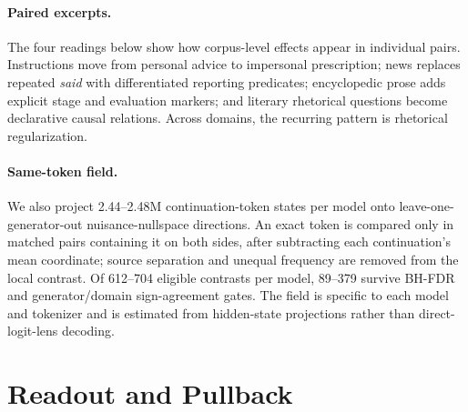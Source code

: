 \paragraph{Paired excerpts.} The four readings below show how corpus-level effects appear in individual pairs. Instructions move from personal advice to impersonal prescription; news replaces repeated \emph{said} with differentiated reporting predicates; encyclopedic prose adds explicit stage and evaluation markers; and literary rhetorical questions become declarative causal relations. Across domains, the recurring pattern is rhetorical regularization.

\paragraph{Same-token field.}\label{app:token-field} We also project 2.44--2.48M continuation-token states per model onto leave-one-generator-out nuisance-nullspace directions. An exact token is compared only in matched pairs containing it on both sides, after subtracting each continuation's mean coordinate; source separation and unequal frequency are removed from the local contrast. Of 612--704 eligible contrasts per model, 89--379 survive BH-FDR and generator/domain sign-agreement gates. The field is specific to each model and tokenizer and is estimated from hidden-state projections rather than direct-logit-lens decoding.

\section{Readout and Pullback}
\label{app:direction-detail}

